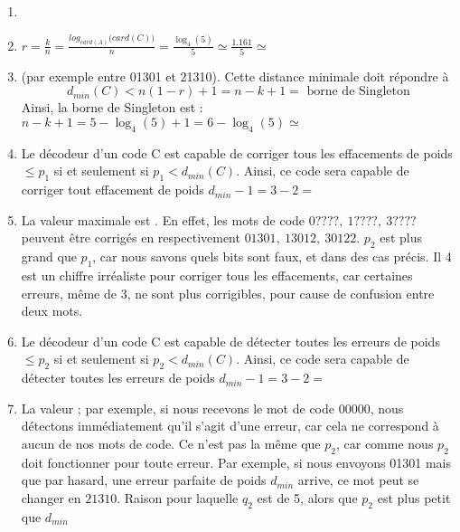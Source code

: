 \documentclass[10p,a4paper]{scrartcl}
\renewcommand{\(}{\left(}
\renewcommand{\)}{\right)}
\begin{document}
\subsection{}
\begin{enumerate}
	\item	{}

	\item 	$r = \frac{k}{n} = \frac{log_{card(A)}\big(card(C)\big)}{n} = \frac{\log_4(5)}{5} \simeq \frac{1.161}{5} \simeq$ 

	\item 	{} (par exemple entre 01301 et 21310). Cette distance minimale doit répondre à 
			\begin{equation*}
				d_{min}(C) < n(1-r) + 1 = n-k+1 = \text{ borne de Singleton}
			\end{equation*}
			Ainsi, la borne de Singleton est : $n-k+1 = 5-\log_4(5) +1 = 6-\log_4(5) \simeq $ 
		
	\item 	Le décodeur d'un code C est capable de corriger tous les effacements de poids $\leq p_1$ si et seulement si $p_1 < d_{min}(C)$. Ainsi, ce code sera capable de corriger tout effacement de poids $d_{min}-1 = 3-2 =$ 
	
	\item 	La valeur maximale est . En effet, les mots de code $0????,\ 1????,\ 3????$ peuvent être corrigés en respectivement $01301,\ 13012,\ 30122$. $p_2$ est plus grand que $p_1$, car nous savons quels bits sont faux, et dans des cas précis. Il 4 est un chiffre irréaliste pour corriger tous les effacements, car certaines erreurs, même de 3, ne sont plus corrigibles, pour cause de confusion entre deux mots.
	
	\item 	 Le décodeur d'un code C est capable de détecter toutes les erreurs de poids $\leq p_2$ si et seulement si $p_2 < d_{min}(C)$. Ainsi, ce code sera capable de détecter toutes les erreurs de poids $d_{min}-1 = 3-2 =$ 
	
	\item 	La valeur  ; par exemple, si nous recevons le mot de code 00000, nous détectons immédiatement qu'il s'agit d'une erreur, car cela ne correspond à aucun de nos mots de code. Ce n'est pas la même que $p_2$, car comme nous $p_2$ doit fonctionner pour toute erreur. Par exemple, si nous envoyons 01301 mais que par hasard, une erreur parfaite de poids $d_{min}$ arrive, ce mot peut se changer en $21310$. Raison pour laquelle $q_2$ est de 5, alors que $p_2$ est plus petit que $d_{min}$
	

\end{enumerate}
\end{document}
